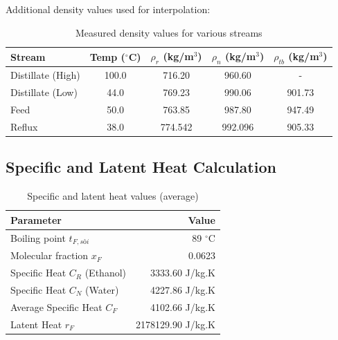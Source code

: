 Additional density values used for interpolation:

\begin{table}[H]
    \centering
    \caption{Measured density values for various streams}
    \begin{tabular}{lcccc}
        \toprule
        \textbf{Stream}   & \textbf{Temp ($^\circ$C)} & \textbf{$\rho_r$ (kg/m$^3$)} & \textbf{$\rho_n$ (kg/m$^3$)} & \textbf{$\rho_{tb}$ (kg/m$^3$)} \\
        \midrule
        Distillate (High) & 100.0                     & 716.20                       & 960.60                       & -                               \\
        Distillate (Low)  & 44.0                      & 769.23                       & 990.06                       & 901.73                          \\
        Feed              & 50.0                      & 763.85                       & 987.80                       & 947.49                          \\
        Reflux            & 38.0                      & 774.542                      & 992.096                      & 905.33                          \\
        \bottomrule
    \end{tabular}
\end{table}

\subsection{Specific and Latent Heat Calculation}

\begin{table}[H]
    \centering
    \caption{Specific and latent heat values (average)}
    \begin{tabular}{lr}
        \toprule
        \textbf{Parameter}            & \textbf{Value}    \\
        \midrule
        Boiling point $t_{F, sôi}$    & 89 $^\circ$C      \\
        Molecular fraction $x_{F}$    & 0.0623            \\
        Specific Heat $C_R$ (Ethanol) & 3333.60 J/kg.K    \\
        Specific Heat $C_N$ (Water)   & 4227.86 J/kg.K    \\
        Average Specific Heat $C_F$   & 4102.66 J/kg.K    \\
        Latent Heat $r_F$             & 2178129.90 J/kg.K \\
        \bottomrule
    \end{tabular}
\end{table}

